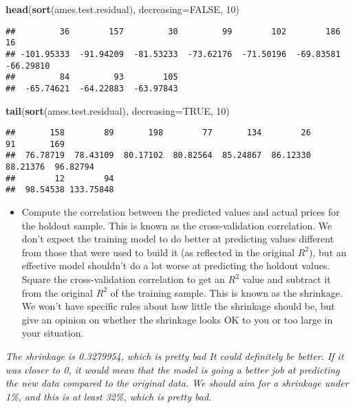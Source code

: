 \documentclass[
]{article}
\newenvironment{Shaded}{\begin{snugshade}}{\end{snugshade}}
\newcommand{\DataTypeTok}[1]{\textcolor[rgb]{0.13,0.29,0.53}{#1}}
\newcommand{\DecValTok}[1]{\textcolor[rgb]{0.00,0.00,0.81}{#1}}
\newcommand{\KeywordTok}[1]{\textcolor[rgb]{0.13,0.29,0.53}{\textbf{#1}}}
\newcommand{\NormalTok}[1]{#1}
\newcommand{\OtherTok}[1]{\textcolor[rgb]{0.56,0.35,0.01}{#1}}
\providecommand{\tightlist}{%
  \setlength{\itemsep}{0pt}\setlength{\parskip}{0pt}}
\begin{document}
\begin{Shaded}
\begin{Highlighting}[]
\KeywordTok{head}\NormalTok{(}\KeywordTok{sort}\NormalTok{(ames.test.residual), }\DataTypeTok{decreasing=}\OtherTok{FALSE}\NormalTok{, }\DecValTok{10}\NormalTok{)}
\end{Highlighting}
\end{Shaded}

\begin{verbatim}
##         36        157         30         99        102        186         16 
## -101.95333  -91.94209  -81.53233  -73.62176  -71.50196  -69.83581  -66.29810 
##         84         93        105 
##  -65.74621  -64.22883  -63.97843
\end{verbatim}

\begin{Shaded}
\begin{Highlighting}[]
\KeywordTok{tail}\NormalTok{(}\KeywordTok{sort}\NormalTok{(ames.test.residual), }\DataTypeTok{decreasing=}\OtherTok{TRUE}\NormalTok{, }\DecValTok{10}\NormalTok{)}
\end{Highlighting}
\end{Shaded}

\begin{verbatim}
##       158        89       198        77       134        26        91       169 
##  76.78719  78.43109  80.17102  80.82564  85.24867  86.12330  88.21376  96.82794 
##        12        94 
##  98.54538 133.75848
\end{verbatim}

\begin{itemize}
\tightlist
\item
  Compute the correlation between the predicted values and actual prices
  for the holdout sample. This is known as the cross-validation
  correlation. We don't expect the training model to do better at
  predicting values different from those that were used to build it (as
  reflected in the original \(R^{2}\)), but an effective model shouldn't
  do a lot worse at predicting the holdout values. Square the
  cross-validation correlation to get an \(R^{2}\) value and subtract it
  from the original \(R^{2}\) of the training sample. This is known as
  the shrinkage. We won't have specific rules about how little the
  shrinkage should be, but give an opinion on whether the shrinkage
  looks OK to you or too large in your situation.
\end{itemize}

\emph{The shrinkage is 0.3279954, which is pretty bad It could
definitely be better. If it was closer to 0, it would mean that the
model is going a better job at predicting the new data compared to the
original data. We should aim for a shrinkage under 1\%, and this is at
least 32\%, which is pretty bad.}
\end{document}
